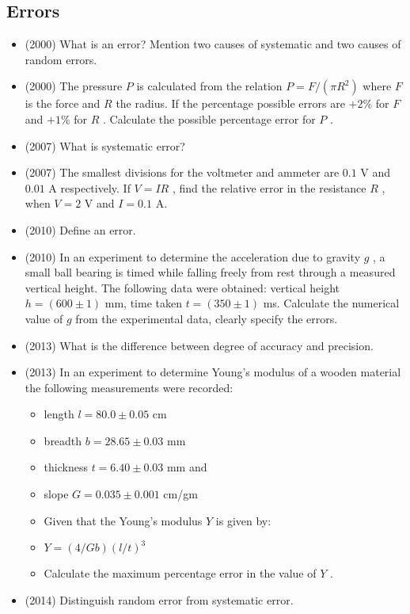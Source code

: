 \documentclass{article}
\begin{document}
\subsection{Errors}
\begin{itemize}
\item (2000)  What is an error? Mention two causes of systematic and two causes of random errors.
\item (2000)  The pressure $ P$ is calculated from the relation $ P=F/( \pi R^{2})$ where $ F$ is the force and $ R$ the radius. If the percentage possible errors are $ +2\%$ for $ F$ and $ +1\%$ for $ R$ . Calculate the possible percentage error for $ P$ .
\item (2007)  What is systematic error?
\item (2007)  The smallest divisions for the voltmeter and ammeter are $ 0.1$ V and $ 0.01$ A respectively.  If $ V=IR$ , find the relative error in the resistance $ R$ , when $ V=2$ V and $ I=0.1$ A.
\item (2010)  Define an error.
\item (2010)  In an experiment to determine the acceleration due to gravity $ g$ , a small ball bearing is timed while falling freely from rest through a measured vertical height. The following data were obtained: vertical height $ h=(600\pm 1)$ mm, time taken $ t=(350\pm 1)$ ms. Calculate the numerical value of $ g$ from the experimental data, clearly specify the errors. 
\item (2013)  What is the difference between degree of accuracy and precision.
\item (2013)  In an experiment to determine Young's modulus of a wooden material the following measurements were recorded:
 \begin{itemize}
\item length $ l=80.0\pm 0.05$ cm 
\item breadth $ b=28.65\pm 0.03$ mm
\item thickness $ t=6.40\pm 0.03$ mm and
\item slope $ G=0.035\pm 0.001$ cm/gm
\item Given that the Young’s modulus $ Y$ is given by:
\item $ Y=(4/Gb)(l/t)^{3}$
\item Calculate the maximum percentage error in the value of $ Y$ .
\end{itemize}
\item (2014)  Distinguish random error from systematic error.
 \begin{itemize}

\end{itemize}
\end{itemize}
\end{document}

